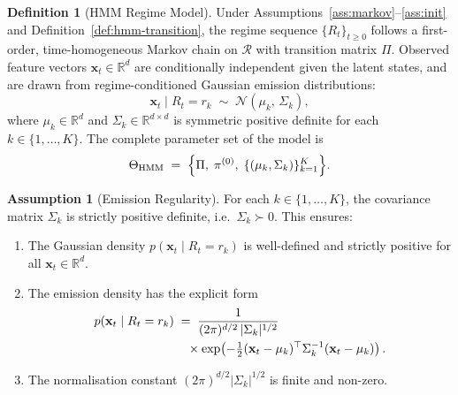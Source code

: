 \documentclass[12pt,openany]{book}
\newcommand{\bfx}{\mathbf{x}}
\numberwithin{equation}{chapter}
\theoremstyle{plain}
\theoremstyle{definition}
\newtheorem{definition}[theorem]{Definition}
\newtheorem{assumption}[theorem]{Assumption}
\theoremstyle{remark}
\numberwithin{equation}{chapter}
\theoremstyle{plain}
\begin{document}
\begin{definition}[HMM Regime Model]
\label{def:hmm}
Under Assumptions~\ref{ass:markov}--\ref{ass:init} and
Definition~\ref{def:hmm-transition}, the regime sequence
$\{R_t\}_{t \geq 0}$ follows a first-order, time-homogeneous Markov
chain on $\mathcal{R}$ with transition matrix $\Pi$.
Observed feature vectors $\bfx_t \in \mathbb{R}^d$ are conditionally
independent given the latent states, and are drawn from
regime-conditioned Gaussian emission distributions:
\begin{equation}
  \bfx_t \mid R_t = r_k
  \;\sim\;
  \mathcal{N}\!\left(\mu_k,\, \Sigma_k\right),
  \label{eq:hmm-emission}
\end{equation}
where $\mu_k \in \mathbb{R}^d$ and $\Sigma_k \in \mathbb{R}^{d \times d}$
is symmetric positive definite for each $k \in \{1,\ldots,K\}$.
The complete parameter set of the model is
\begin{equation}
  \Theta_{\mathrm{HMM}}
  \;=\;
  \Bigl\{\Pi,\;\pi^{(0)},\;\{(\mu_k, \Sigma_k)\}_{k=1}^{K}\Bigr\}.
  \label{eq:hmm-params}
\end{equation}
\end{definition}

\begin{assumption}[Emission Regularity]
\label{ass:emission}
For each $k \in \{1,\ldots,K\}$, the covariance matrix $\Sigma_k$ is
strictly positive definite, i.e.\ $\Sigma_k \succ 0$.  This ensures:
\begin{enumerate}
  \item The Gaussian density $p(\bfx_t \mid R_t = r_k)$ is well-defined
        and strictly positive for all $\bfx_t \in \mathbb{R}^d$.
  \item The emission density has the explicit form
        \begin{align}
          p(\bfx_t \mid R_t = r_k)
          &\;=\;
          \frac{1}{(2\pi)^{d/2}\,|\Sigma_k|^{1/2}}
          \notag\\
          &\quad\times
          \exp\!\left(-\tfrac{1}{2}
            (\bfx_t - \mu_k)^\top \Sigma_k^{-1} (\bfx_t - \mu_k)
          \right).
          \label{eq:hmm-emission-density}
        \end{align}
  \item The normalisation constant $(2\pi)^{d/2}|\Sigma_k|^{1/2}$ is
        finite and non-zero.
\end{enumerate}
\end{assumption}

\end{document}
